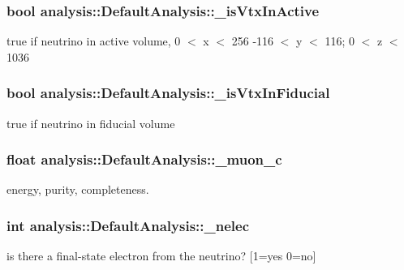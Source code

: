 \subsubsection[{\texorpdfstring{\+\_\+is\+Vtx\+In\+Active}{_isVtxInActive}}]{\setlength{\rightskip}{0pt plus 5cm}bool analysis\+::\+Default\+Analysis\+::\+\_\+is\+Vtx\+In\+Active\hspace{0.3cm}{\ttfamily [private]}}\hypertarget{classanalysis_1_1DefaultAnalysis_a9c03fca7c9d596e0cb490aef4bcd3aed}{}\label{classanalysis_1_1DefaultAnalysis_a9c03fca7c9d596e0cb490aef4bcd3aed}
true if neutrino in active volume, 0 $<$ x $<$ 256 -\/116 $<$ y $<$ 116; 0 $<$ z $<$ 1036 
\subsubsection[{\texorpdfstring{\+\_\+is\+Vtx\+In\+Fiducial}{_isVtxInFiducial}}]{\setlength{\rightskip}{0pt plus 5cm}bool analysis\+::\+Default\+Analysis\+::\+\_\+is\+Vtx\+In\+Fiducial\hspace{0.3cm}{\ttfamily [private]}}\hypertarget{classanalysis_1_1DefaultAnalysis_a3235e005677abb89da08d1668257bca3}{}\label{classanalysis_1_1DefaultAnalysis_a3235e005677abb89da08d1668257bca3}
true if neutrino in fiducial volume 
\subsubsection[{\texorpdfstring{\+\_\+muon\+\_\+c}{_muon_c}}]{\setlength{\rightskip}{0pt plus 5cm}float analysis\+::\+Default\+Analysis\+::\+\_\+muon\+\_\+c\hspace{0.3cm}{\ttfamily [private]}}\hypertarget{classanalysis_1_1DefaultAnalysis_ac6226239ce3915d1363f8038583e8960}{}\label{classanalysis_1_1DefaultAnalysis_ac6226239ce3915d1363f8038583e8960}
energy, purity, completeness. 
\subsubsection[{\texorpdfstring{\+\_\+nelec}{_nelec}}]{\setlength{\rightskip}{0pt plus 5cm}int analysis\+::\+Default\+Analysis\+::\+\_\+nelec\hspace{0.3cm}{\ttfamily [private]}}\hypertarget{classanalysis_1_1DefaultAnalysis_a6aa372d8781339f60a044c92d974ae53}{}\label{classanalysis_1_1DefaultAnalysis_a6aa372d8781339f60a044c92d974ae53}
is there a final-\/state electron from the neutrino? \mbox{[}1=yes 0=no\mbox{]} 
